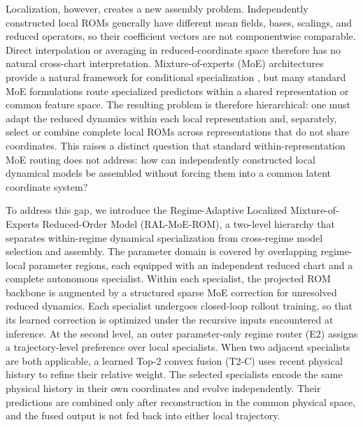 Localization, however, creates a new assembly problem. Independently constructed local ROMs generally have different mean fields, bases, scalings, and reduced operators, so their coefficient vectors are not componentwise comparable. Direct interpolation or averaging in reduced-coordinate space therefore has no natural cross-chart interpretation. Mixture-of-experts (MoE) architectures provide a natural framework for conditional specialization \citep{jacobs1991,jordan1994,shazeer2017,fedus2022}, but many standard MoE formulations route specialized predictors within a shared representation or common feature space. The resulting problem is therefore hierarchical: one must adapt the reduced dynamics within each local representation and, separately, select or combine complete local ROMs across representations that do not share coordinates. This raises a distinct question that standard within-representation MoE routing does not address: how can independently constructed local dynamical models be assembled without forcing them into a common latent coordinate system?


To address this gap, we introduce the Regime-Adaptive Localized Mixture-of-Experts Reduced-Order Model (RAL-MoE-ROM), a two-level hierarchy that separates within-regime dynamical specialization from cross-regime model selection and assembly. The parameter domain is covered by overlapping regime-local parameter regions, each equipped with an independent reduced chart and a complete autonomous specialist. Within each specialist, the projected ROM backbone is augmented by a structured sparse MoE correction for unresolved reduced dynamics. Each specialist undergoes closed-loop rollout training, so that its learned correction is optimized under the recursive inputs encountered at inference. At the second level, an outer parameter-only regime router (E2) assigns a trajectory-level preference over local specialists. When two adjacent specialists are both applicable, a learned Top-2 convex fusion (T2-C) uses recent physical history to refine their relative weight. The selected specialists encode the same physical history in their own coordinates and evolve independently. Their predictions are combined only after reconstruction in the common physical space, and the fused output is not fed back into either local trajectory.


